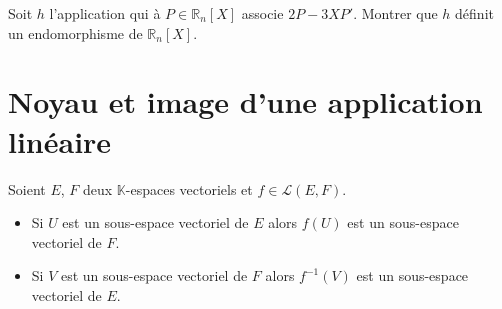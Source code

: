 \documentclass[a4paper,10pt]{report}
\begin{document}
\begin{ApplicationDirecte} Soit $h$ l'application qui à $P \in \mathbb{R}_n[X]$ associe $2P-3XP'$. Montrer que $h$ définit un endomorphisme de $\mathbb{R}_n[X]$.
\end{ApplicationDirecte}

\section{Noyau et image d'une application linéaire}

\begin{Theoreme}{} Soient $E$, $F$ deux $\mathbb{K}$-espaces vectoriels et $f \in \mathcal{L}(E,F)$.

\begin{itemize}
\item Si $U$ est un sous-espace vectoriel de $E$ alors $f(U)$ est un sous-espace vectoriel de $F$.
\item Si $V$ est un sous-espace vectoriel de $F$ alors $f^{-1}(V)$ est un sous-espace vectoriel de $E$.
\end{itemize}
\end{Theoreme}

\begin{Demonstration}{}
%
%
%
%
%

\vspace{12cm}
 \end{Demonstration}
 
\end{document}

